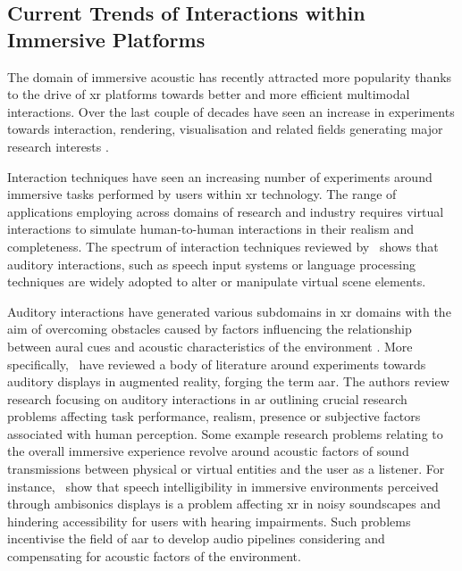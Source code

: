 \subsection{Current Trends of Interactions within Immersive Platforms}
The domain of immersive acoustic has recently attracted more popularity thanks to the drive of \acrshort{xr} platforms towards better and more efficient multimodal interactions. Over the last couple of decades have seen an increase in experiments towards interaction, rendering, visualisation and related fields generating major research interests \citep{kim2018revisiting}.\par
Interaction techniques have seen an increasing number of experiments around immersive tasks performed by users within \acrshort{xr} technology. The range of applications employing  across domains of research and industry requires virtual interactions to simulate human-to-human interactions in their realism and completeness. The spectrum of interaction techniques reviewed by~\cite{spittle2022review} shows that auditory interactions, such as speech input systems or language processing techniques are widely adopted to alter or manipulate virtual scene elements.\par
Auditory interactions have generated various subdomains in \acrshort{xr} domains with the aim of overcoming obstacles caused by factors influencing the relationship between aural cues and acoustic characteristics of the environment \citep{park2022metaverse}.
More specifically,~\cite{yang2022audio} have reviewed a body of literature around experiments towards auditory displays in augmented reality, forging the term \acrfull{aar}. The authors review research focusing on auditory interactions in \acrshort{ar} outlining crucial research problems affecting task performance, realism, presence or subjective factors associated with human perception. Some example research problems relating to the overall immersive experience revolve around acoustic factors of sound transmissions between physical or virtual entities and the user as a listener. For instance,~\cite{mansour2021speech} show that speech intelligibility in immersive environments perceived through ambisonics displays is a problem affecting \acrshort{xr} in noisy soundscapes and hindering accessibility for users with hearing impairments. Such problems incentivise the field of \acrshort{aar} to develop audio pipelines considering and compensating for acoustic factors of the environment.\par

